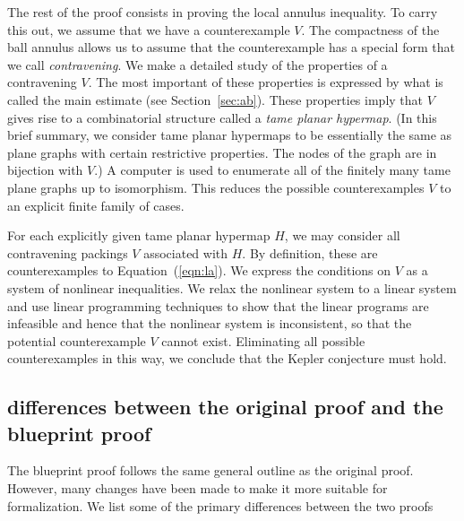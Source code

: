 The rest of the proof consists in proving the local annulus
inequality.  To carry this out, we assume that we have a
counterexample $V$.  The compactness of the ball annulus allows us to
assume that the counterexample has a special form that we call {\it
  contravening}.  We make a detailed study of the properties of a
contravening $V$.  The most important of these properties is expressed
by what is called the main estimate (see Section~\ref{sec:ab}).  These
properties imply that $V$ gives rise to a combinatorial structure
called a {\it tame planar hypermap}.  (In this brief summary, we
consider tame planar hypermaps to be essentially the same as plane
graphs with certain restrictive properties.  The nodes of the graph
are in bijection with $V$.)  A computer is used to enumerate all of
the finitely many tame plane graphs up to isomorphism.  This reduces
the possible counterexamples $V$ to an explicit finite family of
cases.

For each explicitly given tame planar hypermap $H$, we may consider
all contravening packings $V$ associated with $H$.  By definition,
these are counterexamples to Equation~(\ref{eqn:la}).  We express the
conditions on $V$ as a system of nonlinear inequalities.  We relax the
nonlinear system to a linear system and use linear programming
techniques to show that the linear programs are infeasible and hence
that the nonlinear system is inconsistent, so that the potential
counterexample $V$ cannot exist.  Eliminating all possible
counterexamples in this way, we conclude that the Kepler conjecture
must hold.

\subsection{differences between
 the original proof and the blueprint  proof}

The blueprint proof follows the same general outline as the original
proof.  However, many changes have been made to make it more suitable
for formalization.  We list some of the primary differences between
the two proofs

